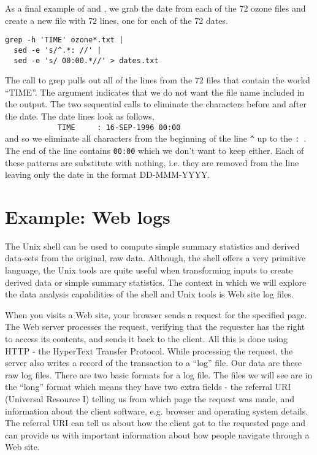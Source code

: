 As a final example of  and , we grab the date from
each of the 72 ozone files and create a new file with $72$ lines, one
for each of the $72$ dates.
\begin{verbatim}
grep -h 'TIME' ozone*.txt | 
  sed -e 's/^.*: //' | 
  sed -e 's/ 00:00.*//' > dates.txt
\end{verbatim}
The call to grep pulls out all of the lines from the $72$ files that
contain the workd ``TIME''.  The  argument indicates that
we do not want the file name included in the output. The two
sequential calls to  eliminate the characters before and
after the date. The date lines look as follows,\\
\verb+            TIME     : 16-SEP-1996 00:00+ 
\\
and so we eliminate
all characters from the beginning of the line \verb+^+ up to the
\verb+: +.  The end of the line contains \verb+00:00+ which we don't
want to keep either.  Each of these patterns are substitute with
nothing, i.e. they are removed from the line leaving only the date in
the format DD-MMM-YYYY.



\section{Example: Web logs}\label{sec:weblog}
The Unix shell can be used to compute simple summary statistics and
derived data-sets from the original, raw data.  Although, the shell
offers a very primitive language, the Unix tools are quite useful when
transforming inputs to create derived data or simple summary
statistics.  The context in which we will explore the data
analysis capabilities of the shell and Unix tools is Web site log
files.

When you visits a Web site, your browser sends a request for the
specified page.  The Web server processes the request, verifying that
the requester has the right to access its contents, and sends it back
to the client.  All this is done using HTTP - the HyperText Transfer
Protocol.  While processing the request, the server also writes a
record of the transaction to a ``log'' file.  Our data are these
raw log files.  There are two basic formats for a log file.
The files we will see are in the ``long'' format which means they
have two extra fields - the referral URI (Universal Resource I) telling us from which page
the request was made,  and information about the 
client software, e.g. browser and operating system details.
The referral URI can tell us about how the client got to the requested
page and can provide us with important information about 
how people navigate through a Web site.


